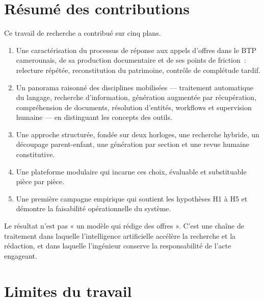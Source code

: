 
\section*{Résumé des contributions}

Ce travail de recherche a contribué sur cinq plans.

\begin{enumerate}
  \item {} Une caractérisation du processus de
        réponse aux appels d'offres dans le BTP camerounais, de sa
        production documentaire et de ses points de friction~: relecture
        répétée, reconstitution du patrimoine, contrôle de complétude tardif.
  \item {} Un panorama raisonné des disciplines
        mobilisées --- traitement automatique du langage, recherche
        d'information, génération augmentée par récupération, compréhension
        de documents, résolution d'entités, workflows et supervision
        humaine --- en distinguant les concepts des outils.
  \item {} Une approche structurée, fondée sur deux
        horloges, une recherche hybride, un découpage parent-enfant, une
        génération par section et une revue humaine constitutive.
  \item {} Une plateforme modulaire qui incarne ces
        choix, évaluable et substituable pièce par pièce.
  \item {} Une première campagne empirique qui soutient
        les hypothèses H1 à H5 et démontre la faisabilité opérationnelle
        du système.
\end{enumerate}

Le résultat n'est pas « un modèle qui rédige des offres ». C'est une
chaîne de traitement dans laquelle l'intelligence artificielle accélère
la recherche et la rédaction, et dans laquelle l'ingénieur conserve la
responsabilité de l'acte engageant.

\section*{Limites du travail}

